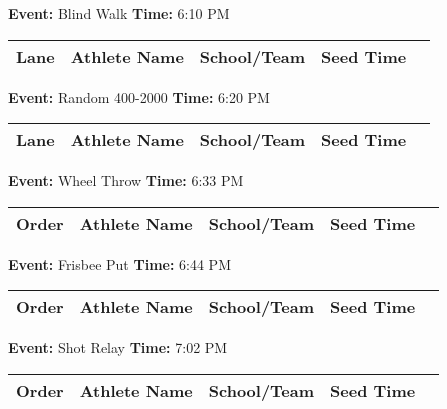 \documentclass[11pt]{article}
\begin{document}
\textbf{Event:} Blind Walk \quad \textbf{Time:} 6:10 PM 

\vspace{1em}
\begin{tabular}{@{}lllll@{}}
\toprule
\textbf{Lane} & \textbf{Athlete Name} & \textbf{School/Team} & \textbf{Seed Time} \\
\midrule

\bottomrule
\end{tabular}
\vspace{2.5em}


\textbf{Event:} Random 400-2000 \quad \textbf{Time:} 6:20 PM 

\vspace{1em}
\begin{tabular}{@{}lllll@{}}
\toprule
\textbf{Lane} & \textbf{Athlete Name} & \textbf{School/Team} & \textbf{Seed Time} \\
\midrule

\bottomrule
\end{tabular}
\vspace{2.5em}


\textbf{Event:} Wheel Throw \quad \textbf{Time:} 6:33 PM 

\vspace{1em}
\begin{tabular}{@{}lllll@{}}
\toprule
\textbf{Order} & \textbf{Athlete Name} & \textbf{School/Team} & \textbf{Seed Time} \\
\midrule

\bottomrule
\end{tabular}
\vspace{2.5em}


\textbf{Event:} Frisbee Put \quad \textbf{Time:} 6:44 PM 

\vspace{1em}
\begin{tabular}{@{}lllll@{}}
\toprule
\textbf{Order} & \textbf{Athlete Name} & \textbf{School/Team} & \textbf{Seed Time} \\
\midrule

\bottomrule
\end{tabular}
\vspace{2.5em}


\textbf{Event:} Shot Relay \quad \textbf{Time:} 7:02 PM 

\vspace{1em}
\begin{tabular}{@{}lllll@{}}
\toprule
\textbf{Order} & \textbf{Athlete Name} & \textbf{School/Team} & \textbf{Seed Time} \\
\midrule

\bottomrule
\end{tabular}
\vspace{2.5em}
\end{document}
